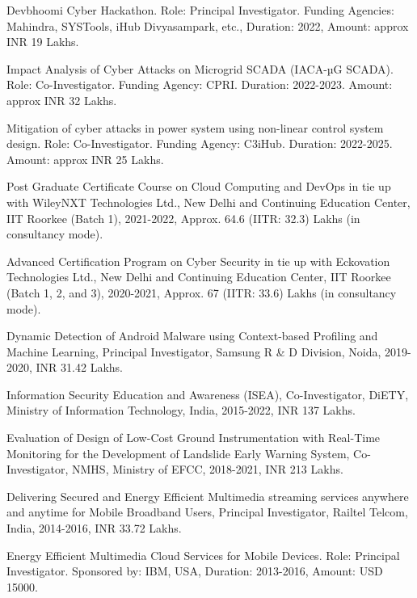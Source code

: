 \begin{etaremune}
\item Devbhoomi Cyber Hackathon. Role: Principal Investigator. Funding Agencies: Mahindra, SYSTools, iHub Divyasampark, etc., Duration: 2022, Amount: approx INR 19 Lakhs.

\item Impact Analysis of Cyber Attacks on Microgrid SCADA (IACA-µG SCADA). Role: Co-Investigator. Funding Agency: CPRI. Duration: 2022-2023. Amount: approx INR 32 Lakhs.

\item Mitigation of cyber attacks in power system using non-linear control system design. Role: Co-Investigator. Funding Agency: C3iHub. Duration: 2022-2025. Amount: approx INR 25 Lakhs.

\item Post Graduate Certificate Course on Cloud Computing and DevOps in tie up with WileyNXT Technologies Ltd., New Delhi and Continuing Education Center, IIT Roorkee (Batch 1), 2021-2022, Approx. 64.6 (IITR: 32.3) Lakhs (in consultancy mode).

\item Advanced Certification Program on Cyber Security in tie up with Eckovation Technologies Ltd., New Delhi and Continuing Education Center, IIT Roorkee (Batch 1, 2, and 3), 2020-2021, Approx. 67 (IITR: 33.6) Lakhs (in consultancy mode).

\item Dynamic Detection of Android Malware using Context-based Profiling and Machine Learning, Principal Investigator, Samsung R \& D Division, Noida, 2019-2020, INR 31.42 Lakhs. 

\item Information Security Education and Awareness (ISEA), Co-Investigator, DiETY, Ministry of Information Technology, India, 2015-2022, INR 137 Lakhs. 

\item Evaluation of Design of Low-Cost Ground Instrumentation with Real-Time Monitoring for the Development of Landslide Early Warning System, Co-Investigator, NMHS, Ministry of EFCC, 2018-2021, INR 213 Lakhs.

\item Delivering Secured and Energy Efficient Multimedia streaming services anywhere and anytime for Mobile Broadband Users, Principal Investigator, Railtel Telcom, India, 2014-2016, INR 33.72 Lakhs. 

\item Energy Efficient Multimedia Cloud Services for Mobile Devices. Role: Principal Investigator. Sponsored by: IBM, USA, Duration: 2013-2016, Amount: USD 15000. 

\end{etaremune}